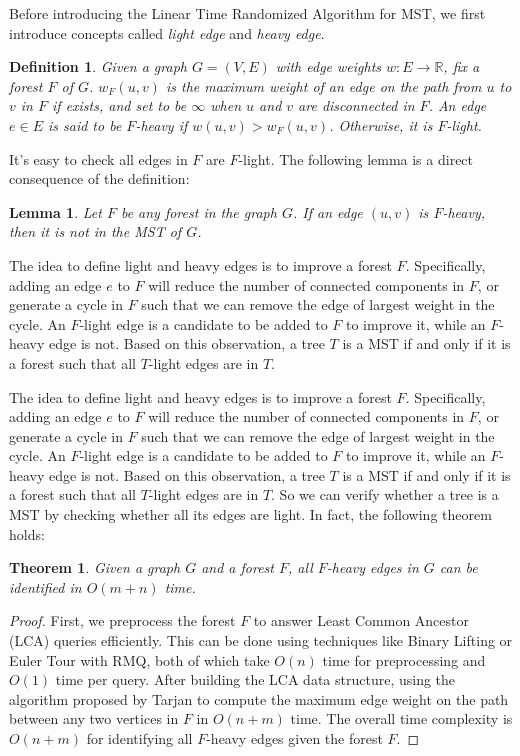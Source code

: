 \documentclass[11pt]{article}
\theoremstyle{plain}
\newtheorem{lemma}{Lemma}[section]
\newtheorem{theorem}{Theorem}[section]
\newtheorem{definition}{Definition}[section]
\begin{document}
Before introducing the Linear Time Randomized Algorithm for MST, we first introduce concepts called \textit{light edge} and \textit{heavy edge}.

\begin{definition}
    Given a graph $G=(V,E)$ with edge weights $w:E\to \mathbb{R}$, fix a forest $F$ of $G$. $w_F(u,v)$ is the maximum weight of an edge on the path from $u$ to $v$ in $F$ if exists, and set to be $\infty$ when $u$ and $v$ are disconnected in $F$. An edge $e\in E$ is said to be $F$-\textit{heavy} if $w(u,v)>w_F(u,v)$. Otherwise, it is $F$-\textit{light}.
\end{definition}

It's easy to check all edges in $F$ are $F$-light. The following lemma is a direct consequence of the definition:

\begin{lemma}
    Let $F$ be any forest in the graph $G$. If an edge $(u,v)$ is $F$-heavy, then it is not in the MST of $G$.
\end{lemma}

The idea to define light and heavy edges is to improve a forest $F$. Specifically, adding an edge $e$ to $F$ will reduce the number of connected components in $F$, or generate a cycle in $F$ such that we can remove the edge of largest weight in the cycle. An $F$-light edge is a candidate to be added to $F$ to improve it, while an $F$-heavy edge is not. Based on this observation, a tree $T$ is a MST if and only if it is a forest such that all $T$-light edges are in $T$.

The idea to define light and heavy edges is to improve a forest $F$. Specifically, adding an edge $e$ to $F$ will reduce the number of connected components in $F$, or generate a cycle in $F$ such that we can remove the edge of largest weight in the cycle. An $F$-light edge is a candidate to be added to $F$ to improve it, while an $F$-heavy edge is not. Based on this observation, a tree $T$ is a MST if and only if it is a forest such that all $T$-light edges are in $T$. So we can verify whether a tree is a MST by checking whether all its edges are light. In fact, the following theorem holds:

\begin{theorem}
    \label{theorem:heavy}
    Given a graph $G$ and a forest $F$, all $F$-heavy edges in $G$ can be identified in $O(m+n)$ time.
\end{theorem}
\begin{proof}
    First, we preprocess the forest $F$ to answer Least Common Ancestor (LCA) queries efficiently. This can be done using techniques like Binary Lifting or Euler Tour with RMQ, both of which take $O(n)$ time for preprocessing and $O(1)$ time per query\cite{bender2000lca}. After building the LCA data structure, using the algorithm proposed by Tarjan\cite{doi:10.1137/0221070} to compute the maximum edge weight on the path between any two vertices in $F$ in $O(n+m)$ time. The overall time complexity is $O(n + m)$ for identifying all $F$-heavy edges given the forest $F$.
\end{proof}
\end{document}
